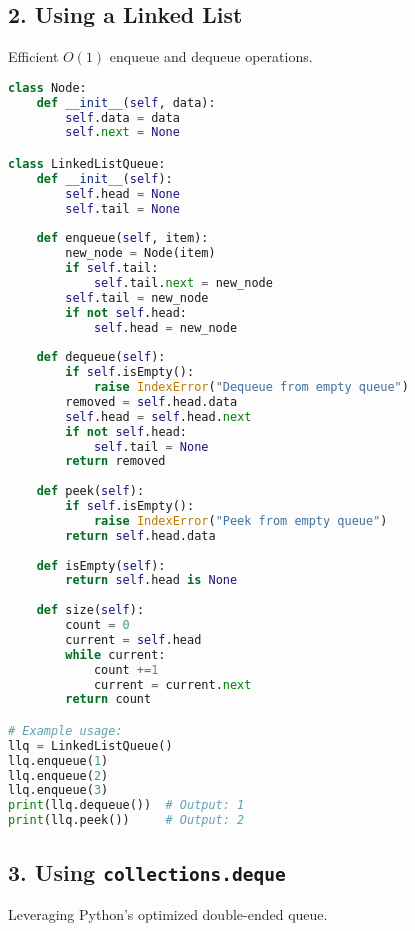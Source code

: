 \subsection*{2. Using a Linked List}
Efficient \(O(1)\) enqueue and dequeue operations.

\begin{fullwidth}
\begin{lstlisting}[language=Python]
class Node:
    def __init__(self, data):
        self.data = data
        self.next = None

class LinkedListQueue:
    def __init__(self):
        self.head = None
        self.tail = None
    
    def enqueue(self, item):
        new_node = Node(item)
        if self.tail:
            self.tail.next = new_node
        self.tail = new_node
        if not self.head:
            self.head = new_node
    
    def dequeue(self):
        if self.isEmpty():
            raise IndexError("Dequeue from empty queue")
        removed = self.head.data
        self.head = self.head.next
        if not self.head:
            self.tail = None
        return removed
    
    def peek(self):
        if self.isEmpty():
            raise IndexError("Peek from empty queue")
        return self.head.data
    
    def isEmpty(self):
        return self.head is None
    
    def size(self):
        count = 0
        current = self.head
        while current:
            count +=1
            current = current.next
        return count

# Example usage:
llq = LinkedListQueue()
llq.enqueue(1)
llq.enqueue(2)
llq.enqueue(3)
print(llq.dequeue())  # Output: 1
print(llq.peek())     # Output: 2
\end{lstlisting}
\end{fullwidth}

\subsection*{3. Using \texttt{collections.deque}}
Leveraging Python’s optimized double-ended queue.


